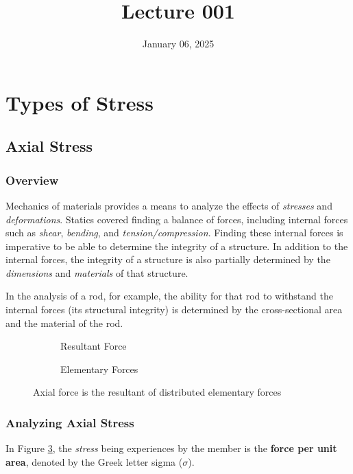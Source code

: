 \documentclass[12pt]{article}
\title{Lecture 001}
\date{January 06, 2025}
\begin{document}
\section{Types of Stress}
\label{sec:typesOfStress}

\subsection{Axial Stress}
\label{ssec:axialStress}

\subsubsection{Overview}

Mechanics of materials provides a means to analyze the effects of \textit{stresses} and \textit{deformations}. Statics covered finding a balance of forces, including internal forces such as \textit{shear}, \textit{bending}, and \textit{tension/compression}. Finding these internal forces is imperative to be able to determine the integrity of a structure. In addition to the internal forces, the integrity of a structure is also partially determined by the \textit{dimensions} and \textit{materials} of that structure.

In the analysis of a rod, for example, the ability for that rod to withstand the internal forces (its structural integrity) is determined by the cross-sectional area and the material of the rod.

\begin{figure}[H]
  \centering
  \begin{subfigure}[H]{0.45\textwidth}
    \centering
    
    \caption{Resultant Force}
    \label{fig:001}
  \end{subfigure}
  \begin{subfigure}[H]{0.45\textwidth}
    \centering
    
    \caption{Elementary Forces}
    \label{fig:002}
  \end{subfigure}
  \caption{Axial force is the resultant of distributed elementary forces}
  \label{fig:axialVsElementary}
\end{figure}

\subsubsection{Analyzing Axial Stress}
\label{sssec:analyzingAxialStress}

In Figure \ref{fig:axialVsElementary}, the \textit{stress} being experiences by the member is the \textbf{force per unit area}, denoted by the Greek letter sigma ($\sigma$).
\end{document}
